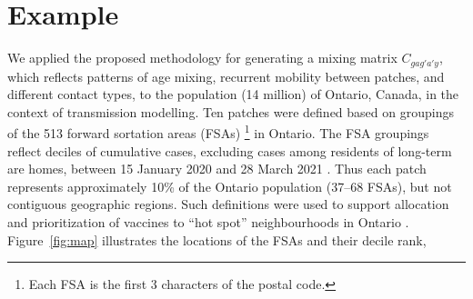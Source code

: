 \section{Example}\label{ex}
We applied the proposed methodology for generating a mixing matrix $C_{gag'a'y}$,
which reflects patterns of age mixing, recurrent mobility between patches, and different contact types,
to the population (14 million) of Ontario, Canada, in the context of \covid transmission modelling.
Ten patches were defined based on groupings of the 513 forward sortation areas (FSAs)%
\footnote{Each FSA is the first 3 characters of the postal code.} in Ontario.
The FSA groupings reflect deciles of cumulative \covid cases,
excluding cases among residents of long-term are homes,
between 15 January 2020 and 28 March 2021 \cite{ICES2020}.
Thus each patch represents approximately 10\% of the Ontario population (\mbox{37--68} FSAs),
but not contiguous geographic regions.
Such definitions were used to support allocation and prioritization of \covid vaccines
to ``hot spot'' neighbourhoods in Ontario \cite{Mishra2021,Brown2021}.
Figure~\ref{fig:map} illustrates the locations of the FSAs and their decile rank,
